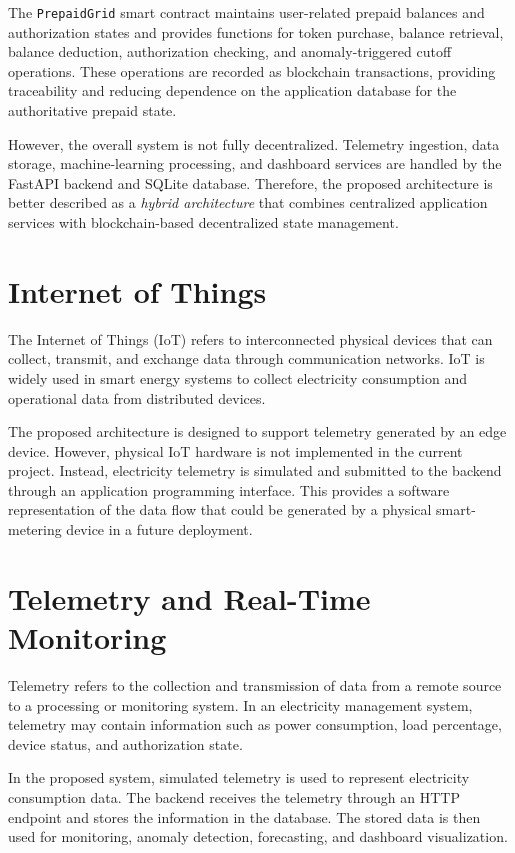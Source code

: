 The \texttt{PrepaidGrid} smart contract maintains user-related prepaid balances and authorization states and provides functions for token purchase, balance retrieval, balance deduction, authorization checking, and anomaly-triggered cutoff operations. These operations are recorded as blockchain transactions, providing traceability and reducing dependence on the application database for the authoritative prepaid state.

However, the overall system is not fully decentralized. Telemetry ingestion, data storage, machine-learning processing, and dashboard services are handled by the FastAPI backend and SQLite database. Therefore, the proposed architecture is better described as a \textit{hybrid architecture} that combines centralized application services with blockchain-based decentralized state management.


\section{Internet of Things}

The Internet of Things (IoT) refers to interconnected physical devices that can collect, transmit, and exchange data through communication networks. IoT is widely used in smart energy systems to collect electricity consumption and operational data from distributed devices.

The proposed architecture is designed to support telemetry generated by an edge device. However, physical IoT hardware is not implemented in the current project. Instead, electricity telemetry is simulated and submitted to the backend through an application programming interface. This provides a software representation of the data flow that could be generated by a physical smart-metering device in a future deployment.


\section{Telemetry and Real-Time Monitoring}

Telemetry refers to the collection and transmission of data from a remote source to a processing or monitoring system. In an electricity management system, telemetry may contain information such as power consumption, load percentage, device status, and authorization state.

In the proposed system, simulated telemetry is used to represent electricity consumption data. The backend receives the telemetry through an HTTP endpoint and stores the information in the database. The stored data is then used for monitoring, anomaly detection, forecasting, and dashboard visualization.


